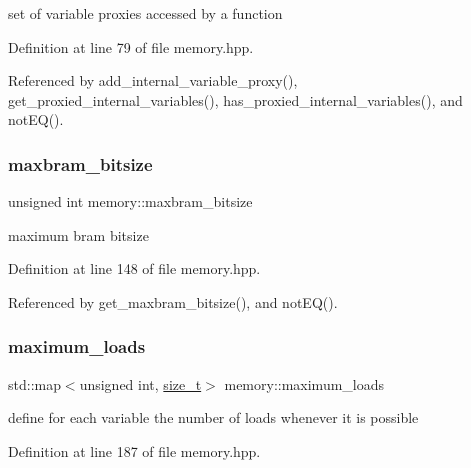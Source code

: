set of variable proxies accessed by a function 



Definition at line 79 of file memory.\+hpp.



Referenced by add\+\_\+internal\+\_\+variable\+\_\+proxy(), get\+\_\+proxied\+\_\+internal\+\_\+variables(), has\+\_\+proxied\+\_\+internal\+\_\+variables(), and not\+E\+Q().

\mbox{\label{classmemory_a06a2006636c058647483276947faaede}} 
\subsubsection{\texorpdfstring{maxbram\+\_\+bitsize}{maxbram\_bitsize}}
{\footnotesize\ttfamily unsigned int memory\+::maxbram\+\_\+bitsize\hspace{0.3cm}{\ttfamily [private]}}



maximum bram bitsize 



Definition at line 148 of file memory.\+hpp.



Referenced by get\+\_\+maxbram\+\_\+bitsize(), and not\+E\+Q().

\mbox{\label{classmemory_a7723dbe3d9d2f93d48e565757d3a6822}} 
\subsubsection{\texorpdfstring{maximum\+\_\+loads}{maximum\_loads}}
{\footnotesize\ttfamily std\+::map$<$unsigned int, \hyperlink{tutorial__fpt__2017_2intro_2sixth_2test_8c_a7c94ea6f8948649f8d181ae55911eeaf}{size\+\_\+t}$>$ memory\+::maximum\+\_\+loads\hspace{0.3cm}{\ttfamily [private]}}



define for each variable the number of loads whenever it is possible 



Definition at line 187 of file memory.\+hpp.



